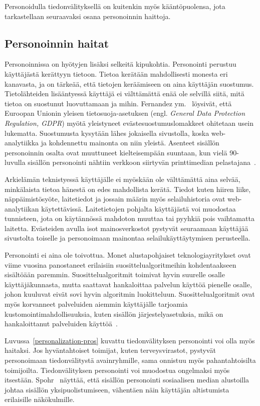\documentclass[finnish, 12pt, a4paper, elec, utf8, a-1b]{aaltothesis}
\begin{document}
Personoidulla tiedonvälityksellä on kuitenkin myös kääntöpuolensa, jota
tarkastellaan seuraavaksi osana personoinnin haittoja.

\subsection{Personoinnin haitat}\label{personalization-cons}

Personoinnissa on hyötyjen lisäksi selkeitä kipukohtia. Personointi perustuu
käyttäjästä kerättyyn tietoon. Tietoa kerätään mahdollisesti monesta eri
kanavasta, ja on tärkeää, että tietojen keräämiseen on aina käyttäjän suostumus.
Tietolähteiden lisääntyessä käyttäjä ei välttämättä enää ole selvillä siitä,
mitä tietoa on suostunut luovuttamaan ja mihin. Fernandez
ym.~\cite{10.1145/3476087} löysivät, että Euroopan Unionin yleisen
tietosuoja-asetuksen (engl. \textit{General Data Protection Regulation, GDPR})
myötä yleistyneet evästesuostumuslomakkeet ohitetaan usein lukematta.
Suostumusta kysytään lähes jokaisella sivustolla, koska web-analytiikka ja
kohdennettu mainonta on niin yleistä. Asenteet sisällön personoinnin osalta ovat
muuttuneet kielteisempään suuntaan, kun vielä 90-luvulla sisällön personointi
nähtiin verkkoon siirtyvän printtimedian pelastajana~\cite{adams_1995}.

Arkielämän teknistyessä käyttäjälle ei myöskään ole välttämättä aina selvää,
minkälaista tietoa hänestä on edes mahdollista kerätä. Tiedot kuten hiiren
liike, näppäimistösyöte, laitetiedot ja jossain määrin myös selailuhistoria ovat
web-analytiikan käytettävissä. Laitetietojen pohjalta käyttäjästä voi muodostaa
tunnisteen, jota on käytännössä mahdoton muuttaa tai pyyhkiä pois vaihtamatta
laitetta. Evästeiden avulla isot mainosverkostot pystyvät seuraamaan käyttäjää
sivustolta toiselle ja personoimaan mainontaa selailukäyttäytymisen perusteella.

Personointi ei aina ole toivottua. Monet alustapohjaiset teknologiayritykset
ovat viime vuosina panostaneet erilaisiin suosittelualgoritmeihin kohdentaakseen
sisältöään paremmin. Suosittelualgoritmit toimivat hyvin suurelle osalle
käyttäjäkunnasta, mutta saattavat hankaloittaa palvelun käyttöä pienelle osalle,
johon kuuluvat eivät sovi hyvin algoritmin luokitteluun. Suosittelualgoritmit
ovat myös korvanneet palveluiden aiemmin käyttäjälle tarjoamia
kustomointimahdollisuuksia, kuten sisällön järjestelyasetuksia, mikä on
hankaloittanut palveluiden käyttöä~\cite{patel_2022}.

Luvussa~\ref{personalization-pros} kuvattu tiedonvälityksen personointi voi olla
myös haitaksi. Jos hyväntahtoiset toimijat, kuten terveysvirastot, pystyvät
personoimaan tiedonvälitystä avainryhmille, sama onnistuu myös pahantahtoisilta
toimijoilta. Tiedonvälityksen personointi voi muodostua ongelmaksi myös
itsestään. Spohr~\cite{doi:10.1177/0266382117722446} näyttää, että sisällön
personointi sosiaalisen median alustoilla johtaa sisällön yksipuolistumiseen,
vähentäen näin käyttäjän altistumista erilaisille näkökulmille.
\end{document}
